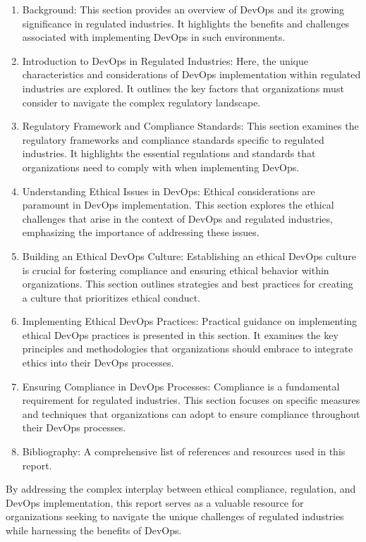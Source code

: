 \begin{enumerate}
    \item Background: This section provides an overview of DevOps and its growing significance in regulated industries. It highlights the benefits and challenges associated with implementing DevOps in such environments.

    \item Introduction to DevOps in Regulated Industries: Here, the unique characteristics and considerations of DevOps implementation within regulated industries are explored. It outlines the key factors that organizations must consider to navigate the complex regulatory landscape.

    \item Regulatory Framework and Compliance Standards: This section examines the regulatory frameworks and compliance standards specific to regulated industries. It highlights the essential regulations and standards that organizations need to comply with when implementing DevOps.

    \item Understanding Ethical Issues in DevOps: Ethical considerations are paramount in DevOps implementation. This section explores the ethical challenges that arise in the context of DevOps and regulated industries, emphasizing the importance of addressing these issues.

    \item Building an Ethical DevOps Culture: Establishing an ethical DevOps culture is crucial for fostering compliance and ensuring ethical behavior within organizations. This section outlines strategies and best practices for creating a culture that prioritizes ethical conduct.

    \item Implementing Ethical DevOps Practices: Practical guidance on implementing ethical DevOps practices is presented in this section. It examines the key principles and methodologies that organizations should embrace to integrate ethics into their DevOps processes.

    \item Ensuring Compliance in DevOps Processes: Compliance is a fundamental requirement for regulated industries. This section focuses on specific measures and techniques that organizations can adopt to ensure compliance throughout their DevOps processes.

    \item Bibliography: A comprehensive list of references and resources used in this report.

\end{enumerate}

By addressing the complex interplay between ethical compliance, regulation, and DevOps implementation, this report serves as a valuable resource for organizations seeking to navigate the unique challenges of regulated industries while harnessing the benefits of DevOps.